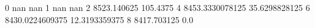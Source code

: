 0 nan nan
1 nan nan
2 8523.140625 105.4375
4 8453.3330078125 35.6298828125
6 8430.0224609375 12.3193359375
8 8417.703125 0.0
